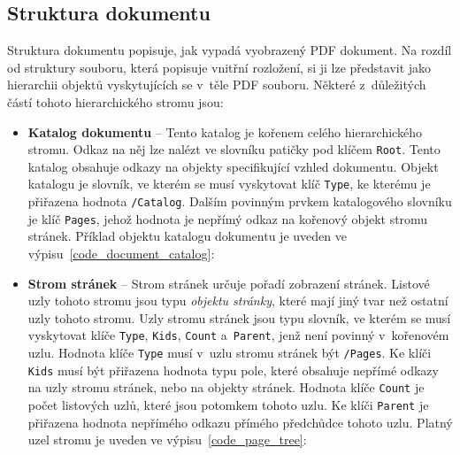 \subsection*{Struktura dokumentu} \label{document_structure}
Struktura dokumentu popisuje, jak vypadá vyobrazený PDF dokument. Na rozdíl
od struktury souboru, která popisuje vnitřní rozložení, si ji
lze představit jako hierarchii objektů vyskytujících se v~těle PDF souboru.
Některé z~důležitých částí tohoto hierarchického stromu jsou:
\begin{itemize}
    \item \textbf{Katalog dokumentu} -- Tento katalog je kořenem celého
    hierarchického stromu. Odkaz na něj lze nalézt ve slovníku patičky pod klíčem
    \texttt{Root}. Tento katalog obsahuje odkazy na objekty specifikující vzhled
    dokumentu. Objekt katalogu je slovník, ve kterém se musí vyskytovat klíč
    \texttt{Type}, ke kterému je přiřazena hodnota \texttt{/Catalog}. Dalším
    povinným prvkem katalogového slovníku je klíč \texttt{Pages}, jehož hodnota je
    nepřímý odkaz na kořenový objekt stromu stránek. Příklad objektu katalogu
    dokumentu je uveden ve výpisu~\ref{code_document_catalog}:

    \item \textbf{Strom stránek} -- Strom stránek určuje pořadí zobrazení stránek.
    Listové uzly tohoto stromu jsou typu \emph{objektu stránky}, které mají jiný
    tvar než ostatní uzly tohoto stromu. Uzly stromu stránek jsou typu slovník,
    ve kterém se musí vyskytovat klíče \texttt{Type}, \texttt{Kids},
    \texttt{Count} a~\texttt{Parent}, jenž není povinný v~kořenovém uzlu.
    Hodnota klíče \texttt{Type} musí v~uzlu stromu stránek být \texttt{/Pages}.
    Ke klíči \texttt{Kids} musí být přiřazena hodnota typu pole, které obsahuje
    nepřímé odkazy na uzly stromu stránek, nebo na objekty stránek. Hodnota klíče
    \texttt{Count} je počet listových uzlů, které jsou potomkem tohoto uzlu. Ke
    klíči \texttt{Parent} je přiřazena hodnota nepřímého odkazu přímého předchůdce
    tohoto uzlu. Platný uzel stromu je uveden ve výpisu~\ref{code_page_tree}:


\end{itemize}
